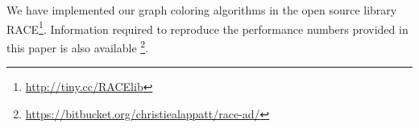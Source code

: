 \begin{itemize}
\end{itemize}
We have implemented our graph coloring algorithms in the open source library \acrfull{RACE}\footnote{\href{http://tiny.cc/RACElib}{http://tiny.cc/RACElib}}. 
{\GW Information required to reproduce the performance numbers provided in this 
paper is also available \footnote{ \href{https://bitbucket.org/christiealappatt/race-ad/}{https://bitbucket.org/christiealappatt/race-ad/}}}.


